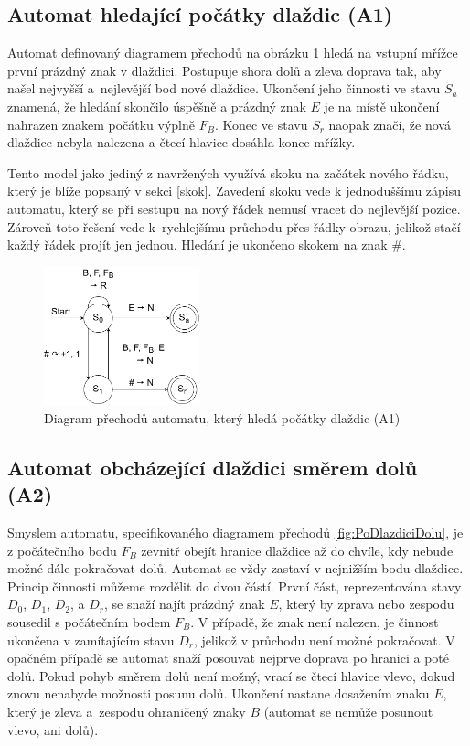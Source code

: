 \subsection*{Automat hledající počátky dlaždic (A1)}
\label{secA1}

Automat definovaný diagramem přechodů na obrázku \ref{fig:PocatkyDlazdic} hledá na vstupní mřížce první prázdný znak v dlaždici. Postupuje shora dolů a zleva doprava tak, aby našel nejvyšší a~nejlevější bod nové dlaždice. Ukončení jeho činnosti ve stavu $S_a$ znamená, že hledání skončilo úspěšně a prázdný znak $E$ je na místě ukončení nahrazen znakem počátku výplně $F_B$. Konec ve stavu $S_r$ naopak značí, že nová dlaždice nebyla nalezena a čtecí hlavice dosáhla konce mřížky.

Tento model jako jediný z navržených využívá skoku na začátek nového řádku, který je blíže popsaný v sekci \ref{skok}. Zavedení skoku vede k jednoduššímu zápisu automatu, který se při sestupu na nový řádek nemusí vracet do nejlevější pozice. Zároveň toto řešení vede k~rychlejšímu průchodu přes řádky obrazu, jelikož stačí každý řádek projít jen jednou. Hledání je ukončeno skokem na znak $\#$.


\begin{figure}[H]
    \centering
    \includegraphics[width=0.4\textwidth]{obrazky-figures/PocatkyDlazdic.pdf}
    \caption{Diagram přechodů automatu, který hledá počátky dlaždic (A1)}
    \label{fig:PocatkyDlazdic}
\end{figure}

\subsection*{Automat obcházející dlaždici směrem dolů (A2)}
\label{secA2}

Smyslem automatu, specifikovaného diagramem přechodů \ref{fig:PoDlazdiciDolu}, je z počátečního bodu $F_B$ zevnitř obejít hranice dlaždice až do chvíle, kdy nebude možné dále pokračovat dolů. Automat se vždy zastaví v nejnižším bodu dlaždice. Princip činnosti můžeme rozdělit do dvou částí. První část, reprezentována stavy $D_0$, $D_1$, $D_2$, a $D_r$, se snaží najít prázdný znak $E$, který by zprava nebo zespodu sousedil s počátečním bodem $F_B$. V případě, že znak není nalezen, je činnost ukončena v zamítajícím stavu $D_r$, jelikož v průchodu není možné pokračovat. V opačném případě se automat snaží posouvat nejprve doprava po hranici a poté dolů. Pokud pohyb směrem dolů není možný, vrací se čtecí hlavice vlevo, dokud znovu nenabyde možnosti posunu dolů. Ukončení nastane dosažením znaku $E$, který je zleva a~zespodu ohraničený znaky $B$ (automat se nemůže posunout vlevo, ani dolů).

